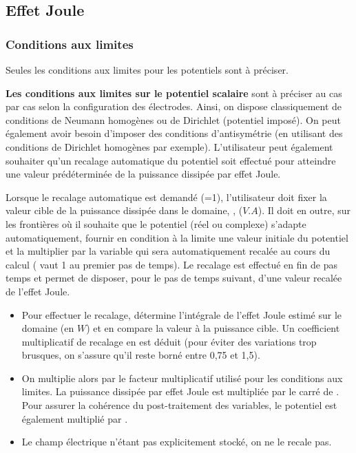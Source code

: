\subsection*{Effet Joule}

\subsubsection*{Conditions aux limites}

Seules les conditions aux limites pour les potentiels sont \`a pr\'eciser.

{\bf Les conditions aux limites sur le potentiel scalaire} sont \`a pr\'eciser
au cas par cas selon la configuration des \'electrodes. Ainsi, on dispose
classiquement de conditions de Neumann homog\`enes ou de Dirichlet (potentiel
impos\'e). On peut \'egalement avoir besoin d'imposer des conditions
d'antisym\'etrie (en utilisant des conditions de Dirichlet homog\`enes par exemple).
L'utilisateur peut \'egalement souhaiter qu'un recalage automatique du potentiel
soit effectu\'e pour atteindre une valeur pr\'ed\'etermin\'ee de la puissance
dissip\'ee par effet Joule.

Lorsque le recalage automatique est demand\'e (=1), l'utilisateur doit fixer la
valeur cible de la puissance dissip\'ee dans le domaine, , ($V.A$).
Il doit en outre, sur les fronti\`eres o\`u il
souhaite que le potentiel (r\'eel ou complexe) s'adapte automatiquement, fournir en
condition \`a la limite une valeur initiale du potentiel et la multiplier par
la variable  qui sera automatiquement recal\'ee au cours du calcul
( vaut 1 au premier pas de temps).
Le recalage est effectu\'e en fin de pas temps et permet de disposer, pour le pas
de temps suivant, d'une valeur recal\'ee de l'effet
Joule.
\begin{itemize}
\item Pour effectuer le recalage, \CS d\'etermine l'int\'egrale de l'effet Joule
estim\'e sur le domaine (en $W$) et en compare la
valeur \`a la puissance cible. Un coefficient multiplicatif de recalage  en
est d\'eduit (pour \'eviter des variations trop brusques,
on s'assure qu'il reste born\'e entre 0,75 et 1,5).
\item On multiplie alors par
 le facteur multiplicatif  utilis\'e pour les conditions aux
limites. La puissance dissip\'ee par effet
Joule est multipli\'ee par
le carr\'e de . Pour assurer la coh\'erence du post-traitement des
variables, le potentiel est \'egalement
multipli\'e par .
\item Le champ \'electrique n'\'etant pas explicitement
stock\'e, on ne le recale pas.
\end{itemize}

